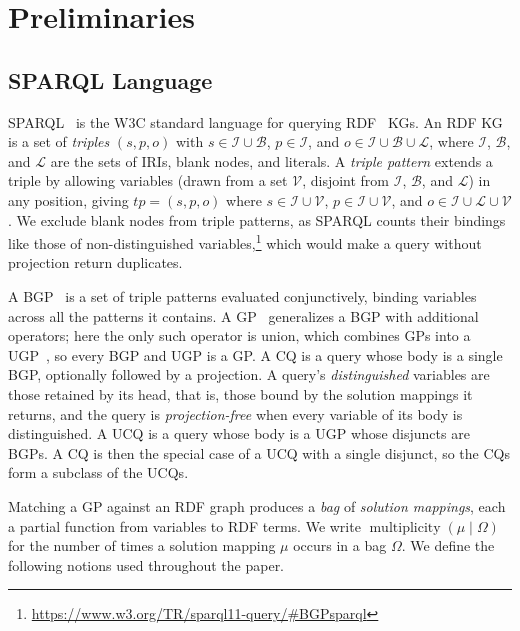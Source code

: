 \section{Preliminaries}\label{sec:preliminaries}

\subsection{SPARQL Language}

SPARQL~\cite{w3SPARQLQuery} is the W3C standard language for querying \ac{RDF}~\cite{w3ConceptsAbstract} \acp{KG}.
An \ac{RDF} \ac{KG} is a set of \emph{triples} $(s, p, o)$ with $s \in \mathcal{I} \cup \mathcal{B}$, $p \in \mathcal{I}$, and $o \in \mathcal{I} \cup \mathcal{B} \cup \mathcal{L}$, where $\mathcal{I}$, $\mathcal{B}$, and $\mathcal{L}$ are the sets of \acp{IRI}, blank nodes, and literals.
A \emph{triple pattern} extends a triple by allowing variables (drawn from a set $\mathcal{V}$, disjoint from $\mathcal{I}$, $\mathcal{B}$, and $\mathcal{L}$) in any position, giving
$\mathit{tp} = (s, p, o)$ where $s \in \mathcal{I} \cup \mathcal{V}$, $p \in \mathcal{I} \cup \mathcal{V}$, and $o \in \mathcal{I} \cup \mathcal{L} \cup \mathcal{V}$.
We exclude blank nodes from triple patterns, as SPARQL counts their bindings like those of non-distinguished variables,\footnote{\url{https://www.w3.org/TR/sparql11-query/\#BGPsparql}} which would make a query without projection return duplicates.

A \ac{BGP}~\cite{w3SPARQLQueryFormal} is a set of triple patterns evaluated conjunctively, binding variables across all the patterns it contains.
A \ac{GP}~\cite{w3SPARQLQueryFormal} generalizes a \ac{BGP} with additional operators; here the only such operator is union, which combines \acp{GP} into a \ac{UGP}~\cite{w3SPARQLQueryFormal}, so every \ac{BGP} and \ac{UGP} is a \ac{GP}.
A \ac{CQ} is a query whose body is a single \ac{BGP}, optionally followed by a projection.
A query's \emph{distinguished} variables are those retained by its head, that is, those bound by the solution mappings it returns, and the query is \emph{projection-free} when every variable of its body is distinguished.
A \ac{UCQ} is a query whose body is a \ac{UGP} whose disjuncts are \acp{BGP}.
A \ac{CQ} is then the special case of a \ac{UCQ} with a single disjunct, so the \acp{CQ} form a subclass of the \acp{UCQ}.

Matching a \ac{GP} against an \ac{RDF} graph produces a \emph{bag} of \emph{solution mappings}, each a partial function from variables to \ac{RDF} terms.
We write $\operatorname{multiplicity}(\mu \mid \Omega)$ for the number of times a solution mapping $\mu$ occurs in a bag $\Omega$.
We define the following notions used throughout the paper.

